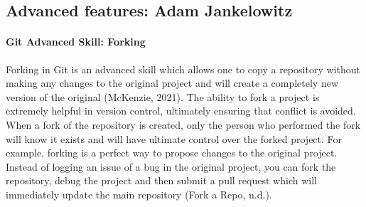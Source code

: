 \documentclass[a4paper, 11pt]{report}
\begin{document}
	\subsection{Advanced features: Adam Jankelowitz}
    \paragraph{Git Advanced Skill: Forking} Forking in Git is an advanced skill which allows one to copy a repository without making any changes to the original project and will create a completely new version of the original (McKenzie, 2021). The ability to fork a project is extremely helpful in version control, ultimately ensuring that conflict is avoided. When a fork of the repository is created, only the person who performed the fork will know it exists and will have ultimate control over the forked project. For example, forking is a perfect way to propose changes to the original project. Instead of logging an issue of a bug in the original project, you can fork the repository, debug the project and then submit a pull request which will immediately update the main repository (Fork a Repo, n.d.). 
    
    
\end{document}
